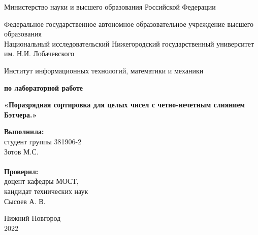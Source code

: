 \documentclass{report}
\begin{document}
\begin{titlepage}

\begin{center}
Министерство науки и высшего образования Российской Федерации
\end{center}

\begin{center}
Федеральное государственное автономное образовательное учреждение высшего образования \\
Национальный исследовательский Нижегородский государственный университет им. Н.И. Лобачевского
\end{center}

\begin{center}
Институт информационных технологий, математики и механики
\end{center}

\vspace{4em}

\begin{center}
\textbf{ по лабораторной работе} \\
\end{center}
\begin{center}
\textbf{\Large«Поразрядная сортировка для целых чисел с четно-нечетным слиянием Бэтчера.»} \\
\end{center}

\vspace{4em}

\newbox{\lbox}
\newlength{\maxl}
\setlength{\maxl}{\wd\lbox}
\hfill\parbox{7cm}{
\hspace*{5cm}\hspace*{-5cm}\textbf{Выполнила:} \\ студент группы 381906-2 \\ Зотов М.С.\\
\\
\hspace*{5cm}\hspace*{-5cm}\textbf{Проверил:}\\ доцент кафедры МОСТ, \\ кандидат технических наук \\ Сысоев А. В.\\
}
\vspace{\fill}

\begin{center} Нижний Новгород \\ 2022 \end{center}

\end{titlepage}
\end{document}
